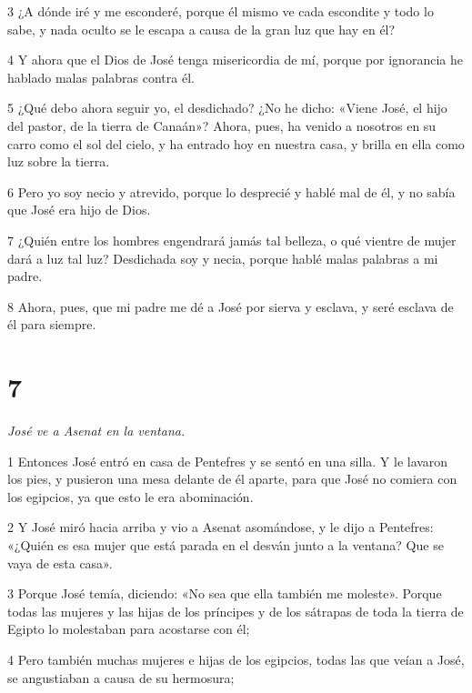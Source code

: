 \par 3 ¿A dónde iré y me esconderé, porque él mismo ve cada escondite y todo lo sabe, y nada oculto se le escapa a causa de la gran luz que hay en él?

\par 4 Y ahora que el Dios de José tenga misericordia de mí, porque por ignorancia he hablado malas palabras contra él.

\par 5 ¿Qué debo ahora seguir yo, el desdichado? ¿No he dicho: «Viene José, el hijo del pastor, de la tierra de Canaán»? Ahora, pues, ha venido a nosotros en su carro como el sol del cielo, y ha entrado hoy en nuestra casa, y brilla en ella como luz sobre la tierra.

\par 6 Pero yo soy necio y atrevido, porque lo desprecié y hablé mal de él, y no sabía que José era hijo de Dios.

\par 7 ¿Quién entre los hombres engendrará jamás tal belleza, o qué vientre de mujer dará a luz tal luz? Desdichada soy y necia, porque hablé malas palabras a mi padre.

\par 8 Ahora, pues, que mi padre me dé a José por sierva y esclava, y seré esclava de él para siempre.

\chapter{7}

\par \textit{José ve a Asenat en la ventana.}

\par 1 Entonces José entró en casa de Pentefres y se sentó en una silla. Y le lavaron los pies, y pusieron una mesa delante de él aparte, para que José no comiera con los egipcios, ya que esto le era abominación.

\par 2 Y José miró hacia arriba y vio a Asenat asomándose, y le dijo a Pentefres: «¿Quién es esa mujer que está parada en el desván junto a la ventana? Que se vaya de esta casa».

\par 3 Porque José temía, diciendo: «No sea que ella también me moleste». Porque todas las mujeres y las hijas de los príncipes y de los sátrapas de toda la tierra de Egipto lo molestaban para acostarse con él;

\par 4 Pero también muchas mujeres e hijas de los egipcios, todas las que veían a José, se angustiaban a causa de su hermosura;

